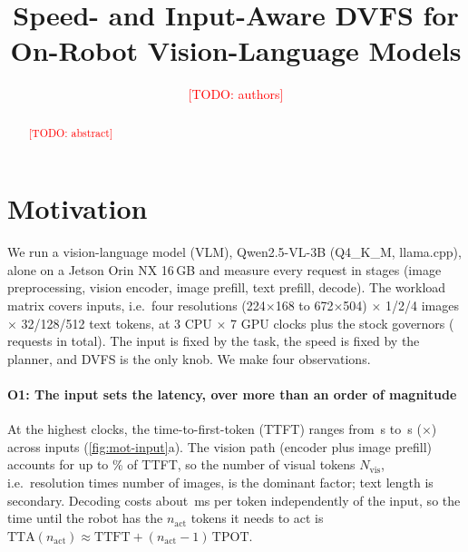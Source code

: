 \documentclass[conference]{IEEEtran}
\newcommand{\todo}[1]{\textcolor{red}{[TODO: #1]}}
\newcommand{\nact}{n_{\mathrm{act}}}
\begin{document}
\title{Speed- and Input-Aware DVFS for On-Robot Vision-Language Models}
\author{\todo{authors}}
\maketitle

\begin{abstract}
\todo{abstract}
\end{abstract}

\section{Motivation}
\label{sec:motivation}

We run a vision-language model (VLM), Qwen2.5-VL-3B (Q4\_K\_M, llama.cpp), alone on a Jetson Orin NX 16\,GB
and measure every request in stages (image preprocessing, vision encoder, image prefill, text prefill,
decode). The workload matrix covers \NInputs{} inputs, i.e.\ four resolutions
(224$\times$168 to 672$\times$504) $\times$ 1/2/4 images $\times$ 32/128/512 text tokens, at
3 CPU $\times$ 7 GPU clocks plus the stock governors (\NReq{} requests in total).
The input is fixed by the task, the speed is fixed by the planner, and DVFS is the only knob.
We make four observations.

\paragraph{O1: The input sets the latency, over more than an order of magnitude}
At the highest clocks, the time-to-first-token (TTFT) ranges from \TtftMin\,s to \TtftMax\,s
(\TtftRatio$\times$) across inputs (\cref{fig:mot-input}a).
The vision path (encoder plus image prefill) accounts for up to \VisShareMax\% of TTFT, so the
number of visual tokens $N_{\mathrm{vis}}$, i.e.\ resolution times number of images, is the dominant
factor; text length is secondary.
Decoding costs about \TpotMs\,ms per token independently of the input, so the time until the robot
has the $\nact$ tokens it needs to act is $\mathrm{TTA}(\nact)\approx\mathrm{TTFT}+(\nact-1)\,\mathrm{TPOT}$.
\end{document}
